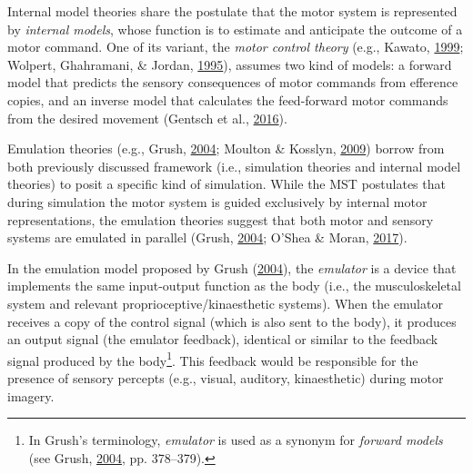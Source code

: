 \documentclass[a4paper,12pt,twoside,openright,oldfontcommands]{memoir}
\let\rmarkdownfootnote\footnote%
\def\footnote{\protect\rmarkdownfootnote}
\begin{document}
Internal model theories share the postulate that the motor system is
represented by \emph{internal models}, whose function is to estimate and
anticipate the outcome of a motor command. One of its variant, the
\emph{motor control theory} (e.g., Kawato,
\protect\hyperlink{ref-kawato_internal_1999}{1999}; Wolpert, Ghahramani,
\& Jordan, \protect\hyperlink{ref-wolpert_internal_1995}{1995}), assumes
two kind of models: a forward model that predicts the sensory
consequences of motor commands from efference copies, and an inverse
model that calculates the feed-forward motor commands from the desired
movement (Gentsch et al.,
\protect\hyperlink{ref-gentsch_towards_2016}{2016}).

Emulation theories (e.g., Grush,
\protect\hyperlink{ref-grush_emulation_2004}{2004}; Moulton \& Kosslyn,
\protect\hyperlink{ref-moulton_imagining_2009}{2009}) borrow from both
previously discussed framework (i.e., simulation theories and internal
model theories) to posit a specific kind of simulation. While the MST
postulates that during simulation the motor system is guided exclusively
by internal motor representations, the emulation theories suggest that
both motor and sensory systems are emulated in parallel (Grush,
\protect\hyperlink{ref-grush_emulation_2004}{2004}; O'Shea \& Moran,
\protect\hyperlink{ref-oshea_does_2017}{2017}).

In the emulation model proposed by Grush
(\protect\hyperlink{ref-grush_emulation_2004}{2004}), the
\emph{emulator} is a device that implements the same input-output
function as the body (i.e., the musculoskeletal system and relevant
proprioceptive/kinaesthetic systems). When the emulator receives a copy
of the control signal (which is also sent to the body), it produces an
output signal (the emulator feedback), identical or similar to the
feedback signal produced by the body\footnote{In Grush's terminology,
  \emph{emulator} is used as a synonym for \emph{forward models} (see
  Grush, \protect\hyperlink{ref-grush_emulation_2004}{2004}, pp.
  378--379).}. This feedback would be responsible for the presence of
sensory percepts (e.g., visual, auditory, kinaesthetic) during motor
imagery.
\end{document}
